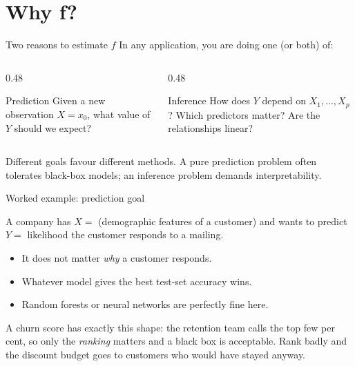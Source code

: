 \documentclass[aspectratio=169,11pt]{beamer}
\begin{document}
\section{Why f?}

\begin{frame}{Two reasons to estimate $f$}
  In any application, you are doing one (or both) of:
  \begin{columns}[T]
    \begin{column}{0.48\textwidth}
      \begin{block}{Prediction}
        Given a new observation $X = x_0$, what value of $Y$ should we
        expect?
      \end{block}
    \end{column}
    \begin{column}{0.48\textwidth}
      \begin{block}{Inference}
        How does $Y$ depend on $X_1, \ldots, X_p$? Which predictors
        matter? Are the relationships linear?
      \end{block}
    \end{column}
  \end{columns}
  \begin{takeaway}
    Different goals favour different methods. A pure prediction
    problem often tolerates black-box models; an inference problem
    demands interpretability.
  \end{takeaway}
\end{frame}

\begin{frame}{Worked example: prediction goal}
  \begin{numexample}
    A company has $X = $ (demographic features of a customer) and
    wants to predict $Y = $ likelihood the customer responds to a
    mailing.
    \begin{itemize}
      \item It does not matter \emph{why} a customer responds.
      \item Whatever model gives the best test-set accuracy wins.
      \item Random forests or neural networks are perfectly fine here.
    \end{itemize}
  \end{numexample}
  A churn score has exactly this shape: the retention team calls the top few per cent, so
  only the \emph{ranking} matters and a black box is acceptable. Rank badly and the discount
  budget goes to customers who would have stayed anyway.
\end{frame}
\end{document}
